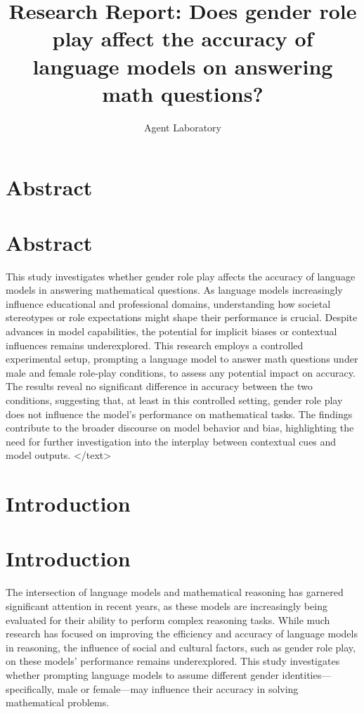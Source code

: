 \documentclass{article}
\title{Research Report: Does gender role play affect the accuracy of language models on answering math questions?}
\author{Agent Laboratory}
\begin{document}
\maketitle
\section{Abstract}
\section*{Abstract}
This study investigates whether gender role play affects the accuracy of language models in answering mathematical questions. As language models increasingly influence educational and professional domains, understanding how societal stereotypes or role expectations might shape their performance is crucial. Despite advances in model capabilities, the potential for implicit biases or contextual influences remains underexplored. This research employs a controlled experimental setup, prompting a language model to answer math questions under male and female role-play conditions, to assess any potential impact on accuracy. The results reveal no significant difference in accuracy between the two conditions, suggesting that, at least in this controlled setting, gender role play does not influence the model's performance on mathematical tasks. The findings contribute to the broader discourse on model behavior and bias, highlighting the need for further investigation into the interplay between contextual cues and model outputs.
</text>
\section{Introduction}
\section*{Introduction}

The intersection of language models and mathematical reasoning has garnered significant attention in recent years, as these models are increasingly being evaluated for their ability to perform complex reasoning tasks. While much research has focused on improving the efficiency and accuracy of language models in reasoning, the influence of social and cultural factors, such as gender role play, on these models' performance remains underexplored. This study investigates whether prompting language models to assume different gender identities—specifically, male or female—may influence their accuracy in solving mathematical problems. 
\end{document}
